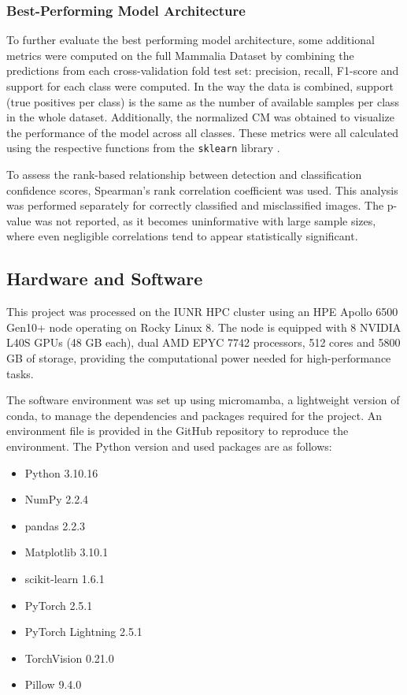     \subsubsection{Best-Performing Model Architecture}
    To further evaluate the best performing model architecture, some additional metrics were computed on the full Mammalia Dataset by combining the predictions from each cross-validation fold test set:
    precision, recall, F1-score and support for each class were computed.
    In the way the data is combined, support (true positives per class) is the same as the number of available samples per class in the whole dataset.
    Additionally, the normalized \ac{CM} was obtained to visualize the performance of the model across all classes.
    These metrics were all calculated using the respective functions from the \texttt{sklearn} library \autocite{pedregosaScikitlearnMachineLearning2011}.

    To assess the rank-based relationship between detection and classification confidence scores, Spearman's rank correlation coefficient was used.
    This analysis was performed separately for correctly classified and misclassified images.
    The p-value was not reported, as it becomes uninformative with large sample sizes, where even negligible correlations tend to appear statistically significant.

    \subsection{Hardware and Software}
    This project was processed on the \ac{IUNR} \ac{HPC} cluster using an HPE Apollo 6500 Gen10+ node operating on Rocky Linux 8.
    The node is equipped with 8 NVIDIA L40S \acp{GPU} (48 \ac{GB} each), dual AMD EPYC 7742 processors, 512 cores and 5800 \ac{GB} of storage, providing the computational power needed for high-performance tasks.

    The software environment was set up using micromamba, a lightweight version of conda, to manage the dependencies and packages required for the project.
    An environment file is provided in the GitHub repository to reproduce the environment.
    The Python version and used packages are as follows:

    \begin{itemize}
        \item Python 3.10.16
        \item NumPy 2.2.4
        \item pandas 2.2.3
        \item Matplotlib 3.10.1
        \item scikit-learn 1.6.1
        \item PyTorch 2.5.1
        \item PyTorch Lightning 2.5.1
        \item TorchVision 0.21.0
        \item Pillow 9.4.0
    \end{itemize}
